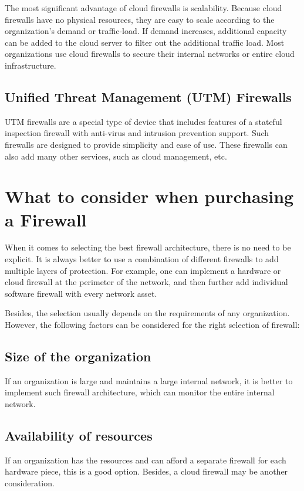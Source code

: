 \documentclass[a4paper,12pt]{book}
\begin{document}
The most significant advantage of cloud firewalls is scalability. Because cloud firewalls have no physical resources, they are easy to scale according to the organization's demand or traffic-load. If demand increases, additional capacity can be added to the cloud server to filter out the additional traffic load. Most organizations use cloud firewalls to secure their internal networks or entire cloud infrastructure.


\subsection{Unified Threat Management (UTM) Firewalls}
UTM firewalls are a special type of device that includes features of a stateful inspection firewall with anti-virus and intrusion prevention support. Such firewalls are designed to provide simplicity and ease of use. These firewalls can also add many other services, such as cloud management, etc.

\section{What to consider when purchasing a Firewall}
When it comes to selecting the best firewall architecture, there is no need to be explicit. It is always better to use a combination of different firewalls to add multiple layers of protection. For example, one can implement a hardware or cloud firewall at the perimeter of the network, and then further add individual software firewall with every network asset.

Besides, the selection usually depends on the requirements of any organization. However, the following factors can be considered for the right selection of firewall:

\subsection{Size of the organization}

If an organization is large and maintains a large internal network, it is better to implement such firewall architecture, which can monitor the entire internal network.

\subsection{Availability of resources}

If an organization has the resources and can afford a separate firewall for each hardware piece, this is a good option. Besides, a cloud firewall may be another consideration.
\end{document}

